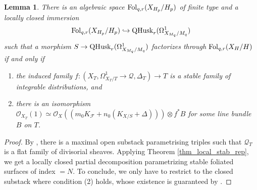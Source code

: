 \documentclass[12pt, a4paper]{amsart}
\newcommand\OO{\mathcal{O}}
\newcommand\Q{\mathcal{Q}}
\newcommand\FF{\mathcal{F}}
\newcounter{Theorem}
\newtheorem{lemma}[theorem]{Lemma}
\theoremstyle{definition}
\theoremstyle{named}
\begin{document}
\begin{lemma}
    There is an algebraic space ${\rm Fol}_{q,r}(X_{H_p}/H_p)$ of finite type and a locally closed immersion 
    $${\rm Fol}_{q,r}(X_{H_p}/H_p)\hookrightarrow {\rm QHusk}_r(\Omega^1_{X_{M_q}/{M_q}})$$ 
    such that a morphism $S\to{\rm QHusk}_r(\Omega^1_{X_{M_q}/{M_q}})$ factorizes through ${\rm Fol}_{q,r}(X_H/H)$ if and only if
    \begin{enumerate}
        \item the induced family $f: (X_T,\Omega^1_{X_T/T}\to \Q ,\Delta_T)\to T$ is a stable family of integrable distributions, and
        \item there is an isomorphism $\OO_{X_T}(1)\simeq \OO_X((m_0 K_\FF + n_0 (K_{X/S}+\Delta)))\otimes f^*B$ for some line bundle $B$ on $T$.
    \end{enumerate}
\end{lemma}
\begin{proof}
By \cite[Theorem 12.1.6]{EGAIV}, there is a maximal open substack parametrising triples such that  $\Q_T$ is a flat family of divisorial sheaves.
Applying Theorem \ref{thm_local_stab_rep}, we get a locally closed partial decomposition 
parametrizing stable foliated surfaces of index $=N$. To conclude, we only have to restrict to the closed substack where condition (2) holds, whose existence is guaranteed by \cite[Corollary 3.22]{modbook}.
\end{proof}
\end{document}
